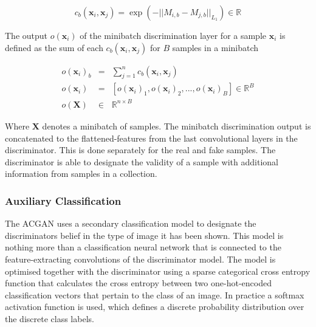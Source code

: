 \documentclass[twocolumn]{article}
\numberwithin{equation}{section}
\begin{document}
\begin{equation}
    c_b(\mathbf{x}_i, \mathbf{x}_j) = \exp({- ||M_{i,b} - M_{j,b}||_{L_1}}) \in \mathbb{R} \nonumber
\end{equation}

The output $o(\mathbf{x}_i)$ of the minibatch discrimination layer for a sample $\mathbf{x}_i$ is defined as the sum of 
each $c_b(\mathbf{x}_i, \mathbf{x}_j)$ for $B$ samples in a minibatch

\begin{eqnarray}
    o(\mathbf{x}_i)_b &=& \sum_{j=1}^n c_b(\mathbf{x}_i, \mathbf{x}_j) \nonumber \\
    o(\mathbf{x}_i) &=& [o(\mathbf{x}_i)_1, o(\mathbf{x}_i)_2, ..., o(\mathbf{x}_i)_B] \in \mathbb{R}^B \nonumber\\
    o(\mathbf{X}) &\in& \mathbb{R}^{n \times B} \nonumber
\end{eqnarray}

Where $\mathbf{X}$ denotes a minibatch of samples. The minibatch discrimination output is concatenated to the 
flattened-features from the last convolutional layers in the discriminator. This is done separately for the real and 
fake samples. The discriminator is able to designate the validity of a sample with additional information from samples 
in a collection.


\subsubsection{Auxiliary Classification}
The ACGAN uses a secondary classification model to designate the discriminators belief in the type of image it has been 
shown. This model is nothing more than a classification neural network that is connected to the feature-extracting 
convolutions of the discriminator model. The model is optimised together with the discriminator using a sparse categorical
cross entropy function that calculates the cross entropy between two one-hot-encoded classification vectors that pertain 
to the class of an image. In practice a softmax activation function is used, which defines a discrete probability 
distribution over the discrete class labels.
\end{document}
